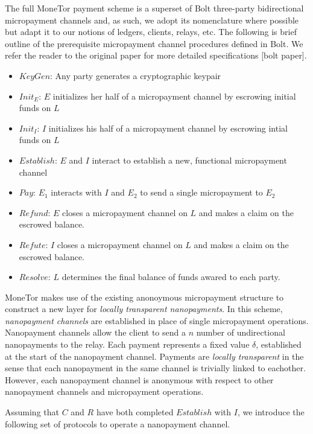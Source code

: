 The full MoneTor payment scheme is a superset of Bolt three-party bidirectional
micropayment channels and, as such, we adopt its nomenclature where possible but
adapt it to our notions of ledgers, clients, relays, etc. The following is brief
outline of the prerequisite micropayment channel procedures defined in Bolt. We
refer the reader to the original paper for more detailed specifications [bolt paper].

\begin{itemize}
\item $KeyGen$: Any party generates a cryptographic keypair
\item $Init_E$: $E$ initializes her half of a micropayment channel by escrowing
  initial funds on $L$
\item $Init_I$: $I$ initializes his half of a micropayment channel by
  escrowing intial funds on $L$
\item $Establish$: $E$ and $I$ interact to establish a new, functional
  micropayment channel
\item $Pay$: $E_1$ interacts with $I$ and $E_2$ to send a single micropayment to $E_2$
\item $Refund$: $E$ closes a micropayment channel on $L$ and makes a claim on
  the escrowed balance.
\item $Refute$: $I$ closes a micropayment channel on $L$ and makes a claim on
  the escrowed balance.
\item $Resolve$: $L$ determines the final balance of funds awared to
  each party.
\end{itemize}

MoneTor makes use of the existing anonoymous micropayment structure to construct
a new layer for \emph{locally transparent nanopayments}. In this scheme,
\emph{nanopayment channels} are established in place of single micropayment
operations. Nanopayment channels allow the client to send a $n$ number of
undirectional nanopayments to the relay. Each payment represents a fixed value
$\delta$, established at the start of the nanopayment channel. Payments are
\emph{locally transparent} in the sense that each nanopayment in the same
channel is trivially linked to eachother. However, each nanopayment channel is
anonymous with respect to other nanopayment channels and micropayment
operations.

Assuming that $C$ and $R$ have both completed $Establish$ with $I$, we introduce
the following set of protocols to operate a nanopayment channel.

